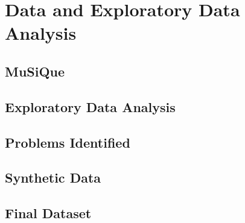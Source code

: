 \chapter{Data and Exploratory Data Analysis}

\section{MuSiQue}

\section{Exploratory Data Analysis}

\section{Problems Identified}

\section{Synthetic Data}

\section{Final Dataset}
